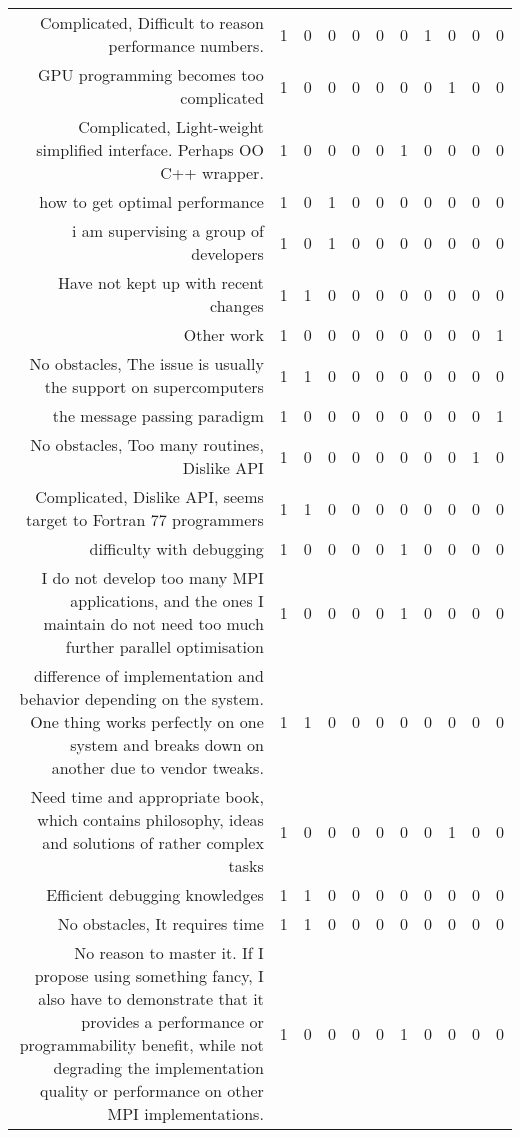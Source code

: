 {\begin{landscape}
\begin{longtable}[htb]{r|c|c|c|c|c|c|c|c|c|c}
{Complicated, Difficult to reason performance numbers.} & 1 & 0 & 0 & 0 & 0 & 0 & 1 & 0 & 0 & 0 \\%
{GPU programming becomes too complicated} & 1 & 0 & 0 & 0 & 0 & 0 & 0 & 1 & 0 & 0 \\%
{Complicated, Light-weight simplified interface. Perhaps OO C++ wrapper.} & 1 & 0 & 0 & 0 & 0 & 1 & 0 & 0 & 0 & 0 \\%
{how to get optimal performance} & 1 & 0 & 1 & 0 & 0 & 0 & 0 & 0 & 0 & 0 \\%
{i am supervising a group of developers} & 1 & 0 & 1 & 0 & 0 & 0 & 0 & 0 & 0 & 0 \\%
{Have not kept up with recent changes} & 1 & 1 & 0 & 0 & 0 & 0 & 0 & 0 & 0 & 0 \\%
{Other work} & 1 & 0 & 0 & 0 & 0 & 0 & 0 & 0 & 0 & 1 \\%
{No obstacles, The issue is usually the support on supercomputers} & 1 & 1 & 0 & 0 & 0 & 0 & 0 & 0 & 0 & 0 \\%
{the message passing paradigm} & 1 & 0 & 0 & 0 & 0 & 0 & 0 & 0 & 0 & 1 \\%
{No obstacles, Too many routines, Dislike API} & 1 & 0 & 0 & 0 & 0 & 0 & 0 & 0 & 1 & 0 \\%
{Complicated, Dislike API, seems target to Fortran 77 programmers} & 1 & 1 & 0 & 0 & 0 & 0 & 0 & 0 & 0 & 0 \\%
{difficulty with debugging} & 1 & 0 & 0 & 0 & 0 & 1 & 0 & 0 & 0 & 0 \\%
{I do not develop too many MPI applications, and the ones I maintain do not need too much further parallel optimisation} & 1 & 0 & 0 & 0 & 0 & 1 & 0 & 0 & 0 & 0 \\%
{difference of implementation and behavior depending on the system. One thing works perfectly on one system and breaks down on another due to vendor tweaks.} & 1 & 1 & 0 & 0 & 0 & 0 & 0 & 0 & 0 & 0 \\%
{Need time and appropriate book, which contains philosophy, ideas and solutions of rather complex tasks} & 1 & 0 & 0 & 0 & 0 & 0 & 0 & 1 & 0 & 0 \\%
{Efficient debugging knowledges} & 1 & 1 & 0 & 0 & 0 & 0 & 0 & 0 & 0 & 0 \\%
{No obstacles, It requires time} & 1 & 1 & 0 & 0 & 0 & 0 & 0 & 0 & 0 & 0 \\%
{No reason to master it. If I propose using something fancy, I also have to demonstrate that it provides a performance or programmability benefit, while not degrading the implementation quality or performance on other MPI implementations.} & 1 & 0 & 0 & 0 & 0 & 1 & 0 & 0 & 0 & 0 \\%

\end{longtable}
\end{landscape}}
